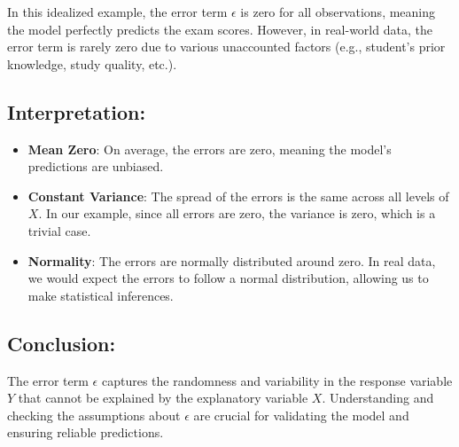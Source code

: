 \documentclass{article}
\begin{document}
In this idealized example, the error term \( \epsilon \) is zero for all observations, meaning the model perfectly predicts the exam scores. However, in real-world data, the error term is rarely zero due to various unaccounted factors (e.g., student's prior knowledge, study quality, etc.).

\subsection*{Interpretation:}

\begin{itemize}
    \item \textbf{Mean Zero}: On average, the errors are zero, meaning the model's predictions are unbiased.
    \item \textbf{Constant Variance}: The spread of the errors is the same across all levels of \( X \). In our example, since all errors are zero, the variance is zero, which is a trivial case.
    \item \textbf{Normality}: The errors are normally distributed around zero. In real data, we would expect the errors to follow a normal distribution, allowing us to make statistical inferences.
\end{itemize}

\subsection*{Conclusion:}

The error term \( \epsilon \) captures the randomness and variability in the response variable \( Y \) that cannot be explained by the explanatory variable \( X \). Understanding and checking the assumptions about \( \epsilon \) are crucial for validating the model and ensuring reliable predictions.
\end{document}
